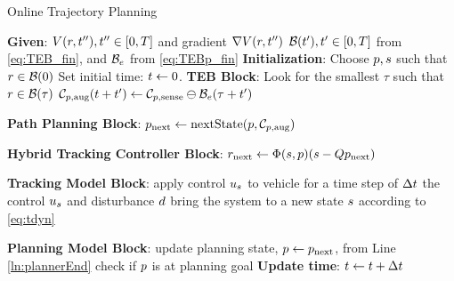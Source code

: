 \begin{algorithm}	
	\caption{Online Trajectory Planning}
	\label{alg:algOnline}
	\begin{algorithmic}[1]
		\STATE \textbf{Given}: \label{ln:gStart}
		\STATE $V(r, t''), t'' \in [0, T]$ and gradient $\nabla V(r, t'')$
 		\STATE $\mathcal B(t'), t' \in [0,T]$ from \eqref{eq:TEB_fin}, and $\mathcal B_e$ from \eqref{eq:TEBp_fin} \label{ln:gEnd}
    \STATE \textbf{Initialization}: \label{ln:Istart}
		\STATE Choose $p, s$ such that $r \in \mathcal B(0)$ 
    \STATE Set initial time: $t \leftarrow 0$. \label{ln:Iend}
		\STATE \textbf{TEB Block}: \label{ln:obsStart}
    \STATE Look for the smallest $\tau$ such that $r \in \mathcal B(\tau)$ \label{ln:infSkip}
		\STATE $\mathcal C_{p,\text{aug}}(t + t') \leftarrow \mathcal C_{p,\text{sense}} \ominus \mathcal B_e(\tau + t')$ \label{ln:obsEnd}
		
		\STATE \textbf{Path Planning Block}:\label{ln:plannerStart}
		\STATE $p_\text{next} \leftarrow \text{nextState}(p, \mathcal C_{p,\text{aug}})$\label{ln:plannerEnd}
		
		\STATE \textbf{Hybrid Tracking Controller Block}:\label{ln:controllerStart}
		\STATE $r_\text{next} \leftarrow \Phi(s,p)(s - Qp_\text{next})$
		
		\ELSE {} 
           \ENDIF \label{ln:controllerEnd}
		
		\STATE \textbf{Tracking Model Block}: \label{ln:trackingStart}
		\STATE apply control $u_s$ to vehicle for a time step of $\Delta t$
    \STATE the control $u_s$ and disturbance $d$ bring the system to a new state $s$ according to \eqref{eq:tdyn} \label{ln:trackingEnd}
		
		\STATE \textbf{Planning Model Block}:\label{ln:planningStart}
		\STATE update planning state, $p \leftarrow p_\text{next}$, from Line \ref{ln:plannerEnd}
		\STATE check if $p$ is at planning goal \label{ln:planningEnd}
    \STATE \textbf{Update time}:
    \STATE $t \leftarrow t + \Delta t$
		\ENDWHILE
	\end{algorithmic}
\end{algorithm}

